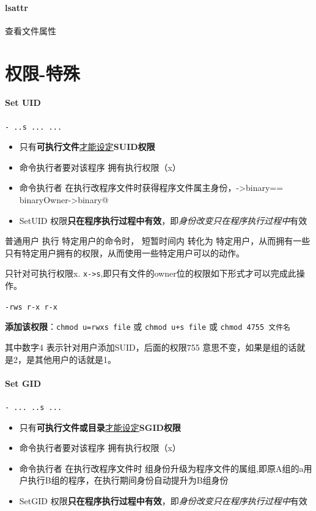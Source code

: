 \documentclass[UTF8,a4paper,12pt]{ctexbook}
\begin{document}
		 \paragraph{lsattr} 查看文件属性	
	\section{权限-特殊}	 
		 \paragraph{Set UID}\verb|- ..s ... ...|
		 	 \begin{itemize}
		 	 	\item 只有\textbf{可执行文件}\underline{才能设定}\textbf{SUID权限}
		 	 	\item 命令执行者\hspace{.5cm}要对该程序\hspace{.5cm} 拥有执行权限（x）
		 	 	\item 命令执行者\hspace{.5cm} 在执行改程序文件时\hspace{.5cm}获得程序文件属主身份，\verb@A->binary== binaryOwner->binary@
		 	 	\item SetUID 权限\textbf{只在程序执行过程中有效}，即\textit{身份改变只在程序执行过程中}有效
		 	 \end{itemize}
		 	
			 普通用户 执行 特定用户的命令时， 短暂时间内 转化为 特定用户，从而拥有一些只有特定用户拥有的权限，从而使用一些特定用户可以的动作。
			 
			 只针对可执行权限x. \verb|x->s|,即只有文件的owner位的权限如下形式才可以完成此操作。
			 
			 \verb|-rws r-x r-x|
			 
			 \textbf{添加该权限}：\verb|chmod u=rwxs file| 或 \verb|chmod u+s file| 或 \verb|chmod 4755 文件名|
			 
			 其中数字4 表示针对用户添加SUID，后面的权限755 意思不变，如果是组的话就是2，是其他用户的话就是1。
			 
		 \paragraph{Set GID}\verb|- ... ..s ...|
		 	 \begin{itemize}
		 	 	\item 只有\textbf{可执行文件或目录}\underline{才能设定}\textbf{SGID权限}
		 	 	\item 命令执行者\hspace{.5cm}要对该程序\hspace{.5cm} 拥有执行权限（x）
		 	 	\item 命令执行者\hspace{.5cm} 在执行改程序文件时\hspace{.5cm} 组身份升级为程序文件的属组,即原A组的a用户执行B组的程序，在执行期间身份自动提升为B组身份
		 	 	\item SetGID 权限\textbf{只在程序执行过程中有效}，即\textit{身份改变只在程序执行过程中}有效
 			\end{itemize}
 			
\end{document}
